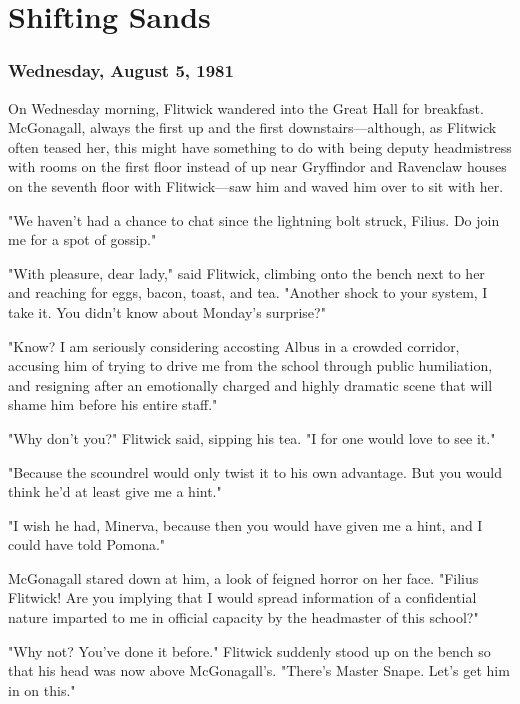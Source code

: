
\chapter{Shifting Sands}

\subsection{Wednesday, August 5, 1981}

On Wednesday morning, Flitwick wandered into the Great Hall for breakfast. McGonagall, always the first up and the first downstairs—although, as Flitwick often teased her, this might have something to do with being deputy headmistress with rooms on the first floor instead of up near Gryffindor and Ravenclaw houses on the seventh floor with Flitwick—saw him and waved him over to sit with her.

"We haven't had a chance to chat since the lightning bolt struck, Filius. Do join me for a spot of gossip."

"With pleasure, dear lady," said Flitwick, climbing onto the bench next to her and reaching for eggs, bacon, toast, and tea. "Another shock to your system, I take it. You didn't know about Monday's surprise?"

"Know? I am seriously considering accosting Albus in a crowded corridor, accusing him of trying to drive me from the school through public humiliation, and resigning after an emotionally charged and highly dramatic scene that will shame him before his entire staff."

"Why don't you?" Flitwick said, sipping his tea. "I for one would love to see it."

"Because the scoundrel would only twist it to his own advantage. But you would think he'd at least give me a hint."

"I wish he had, Minerva, because then you would have given me a hint, and I could have told Pomona."

McGonagall stared down at him, a look of feigned horror on her face. "Filius Flitwick! Are you implying that I would spread information of a confidential nature imparted to me in official capacity by the headmaster of this school?"

"Why not? You've done it before." Flitwick suddenly stood up on the bench so that his head was now above McGonagall's. "There's Master Snape. Let's get him in on this."


